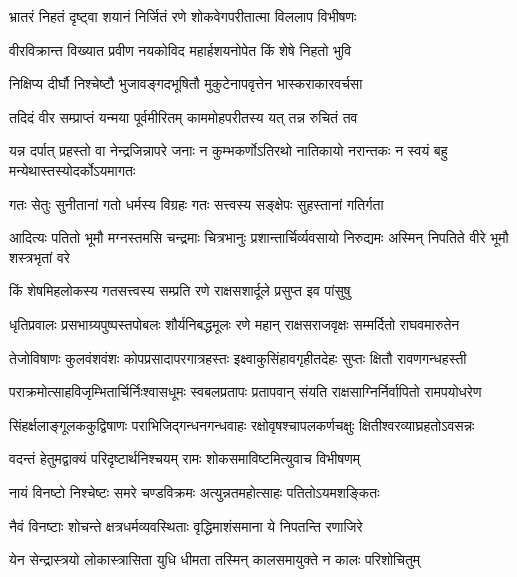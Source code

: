 
\twolineshloka
{भ्रातरं निहतं दृष्ट्वा शयानं निर्जितं रणे}
{शोकवेगपरीतात्मा विललाप विभीषणः} %

\twolineshloka
{वीरविक्रान्त विख्यात प्रवीण नयकोविद}
{महार्हशयनोपेत किं शेषे निहतो भुवि} %

\twolineshloka
{निक्षिप्य दीर्घौ निश्चेष्टौ भुजावङ्गदभूषितौ}
{मुकुटेनापवृत्तेन भास्कराकारवर्चसा} %

\twolineshloka
{तदिदं वीर सम्प्राप्तं यन्मया पूर्वमीरितम्}
{काममोहपरीतस्य यत् तन्न रुचितं तव} %

\threelineshloka
{यन्न दर्पात् प्रहस्तो वा नेन्द्रजिन्नापरे जनाः}
{न कुम्भकर्णोऽतिरथो नातिकायो नरान्तकः}
{न स्वयं बहु मन्येथास्तस्योदर्कोऽयमागतः} %

\twolineshloka
{गतः सेतुः सुनीतानां गतो धर्मस्य विग्रहः}
{गतः सत्त्वस्य सङ्क्षेपः सुहस्तानां गतिर्गता} %

\threelineshloka
{आदित्यः पतितो भूमौ मग्नस्तमसि चन्द्रमाः}
{चित्रभानुः प्रशान्तार्चिर्व्यवसायो निरुद्यमः}
{अस्मिन् निपतिते वीरे भूमौ शस्त्रभृतां वरे} %

\twolineshloka
{किं शेषमिहलोकस्य गतसत्त्वस्य सम्प्रति}
{रणे राक्षसशार्दूले प्रसुप्त इव पांसुषु} %

\twolineshloka
{धृतिप्रवालः प्रसभाग्र्यपुष्पस्तपोबलः शौर्यनिबद्धमूलः}
{रणे महान् राक्षसराजवृक्षः सम्मर्दितो राघवमारुतेन} %

\twolineshloka
{तेजोविषाणः कुलवंशवंशः कोपप्रसादापरगात्रहस्तः}
{इक्ष्वाकुसिंहावगृहीतदेहः सुप्तः क्षितौ रावणगन्धहस्ती} %

\twolineshloka
{पराक्रमोत्साहविजृम्भितार्चिर्निःश्वासधूमः स्वबलप्रतापः}
{प्रतापवान् संयति राक्षसाग्निर्निर्वापितो रामपयोधरेण} %

\twolineshloka
{सिंहर्क्षलाङ्गूलककुद्विषाणः पराभिजिद्गन्धनगन्धवाहः}
{रक्षोवृषश्चापलकर्णचक्षुः क्षितीश्वरव्याघ्रहतोऽवसन्नः} %

\twolineshloka
{वदन्तं हेतुमद्वाक्यं परिदृष्टार्थनिश्चयम्}
{रामः शोकसमाविष्टमित्युवाच विभीषणम्} %

\twolineshloka
{नायं विनष्टो निश्चेष्टः समरे चण्डविक्रमः}
{अत्युन्नतमहोत्साहः पतितोऽयमशङ्कितः} %

\twolineshloka
{नैवं विनष्टाः शोचन्ते क्षत्रधर्मव्यवस्थिताः}
{वृद्धिमाशंसमाना ये निपतन्ति रणाजिरे} %

\twolineshloka
{येन सेन्द्रास्त्रयो लोकास्त्रासिता युधि धीमता}
{तस्मिन् कालसमायुक्ते न कालः परिशोचितुम्} %

